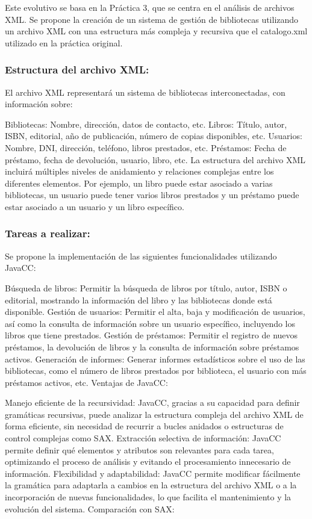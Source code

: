 Este evolutivo se basa en la Práctica 3, que se centra en el análisis de archivos XML. Se propone la creación de un sistema de gestión de bibliotecas utilizando un archivo XML con una estructura más compleja y recursiva que el catalogo.xml utilizado en la práctica original.

\subsubsection*{Estructura del archivo XML:}

El archivo XML representará un sistema de bibliotecas interconectadas, con información sobre:

Bibliotecas: Nombre, dirección, datos de contacto, etc.
Libros: Título, autor, ISBN, editorial, año de publicación, número de copias disponibles, etc.
Usuarios: Nombre, DNI, dirección, teléfono, libros prestados, etc.
Préstamos: Fecha de préstamo, fecha de devolución, usuario, libro, etc.
La estructura del archivo XML incluirá múltiples niveles de anidamiento y relaciones complejas entre los diferentes elementos. Por ejemplo, un libro puede estar asociado a varias bibliotecas, un usuario puede tener varios libros prestados y un préstamo puede estar asociado a un usuario y un libro específico.

\subsubsection*{Tareas a realizar:}

Se propone la implementación de las siguientes funcionalidades utilizando JavaCC:

Búsqueda de libros: Permitir la búsqueda de libros por título, autor, ISBN o editorial, mostrando la información del libro y las bibliotecas donde está disponible.
Gestión de usuarios: Permitir el alta, baja y modificación de usuarios, así como la consulta de información sobre un usuario específico, incluyendo los libros que tiene prestados.
Gestión de préstamos: Permitir el registro de nuevos préstamos, la devolución de libros y la consulta de información sobre préstamos activos.
Generación de informes: Generar informes estadísticos sobre el uso de las bibliotecas, como el número de libros prestados por biblioteca, el usuario con más préstamos activos, etc.
Ventajas de JavaCC:

Manejo eficiente de la recursividad: JavaCC, gracias a su capacidad para definir gramáticas recursivas, puede analizar la estructura compleja del archivo XML de forma eficiente, sin necesidad de recurrir a bucles anidados o estructuras de control complejas como SAX.
Extracción selectiva de información: JavaCC permite definir qué elementos y atributos son relevantes para cada tarea, optimizando el proceso de análisis y evitando el procesamiento innecesario de información.
Flexibilidad y adaptabilidad: JavaCC permite modificar fácilmente la gramática para adaptarla a cambios en la estructura del archivo XML o a la incorporación de nuevas funcionalidades, lo que facilita el mantenimiento y la evolución del sistema.
Comparación con SAX:

